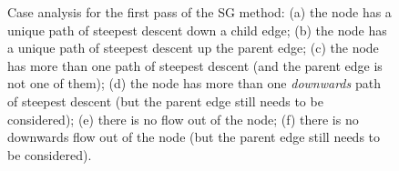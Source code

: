 \documentclass[preprint,a4paper]{elsarticle}
\newenvironment{stusubfig}[1]
{
	\begin{figure}[#1]
	\begin{center}
}
{
	\end{center}
	\end{figure}
}
\begin{document}
\begin{stusubfig}{!t}
	\hspace{4mm}%
\caption{Case analysis for the first pass of the SG method: (a) the node has a unique path of steepest descent down a child edge; (b) the node has a unique path of steepest descent up the parent edge; (c) the node has more than one path of steepest descent (and the parent edge is not one of them); (d) the node has more than one \emph{downwards} path of steepest descent (but the parent edge still needs to be considered); (e) there is no flow out of the node; (f) there is no downwards flow out of the node (but the parent edge still needs to be considered).}
\label{fig:segmentation-waterfall-smg-pass1cases}
\end{stusubfig}
\end{document}

